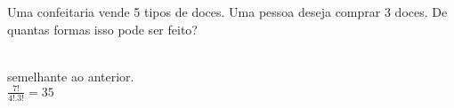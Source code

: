 \begin{ex}
 Uma confeitaria vende 5 tipos de doces. Uma pessoa deseja comprar 3 doces. De quantas formas isso pode ser feito?
   \begin{sol}
       \phantom{A} \\
    semelhante ao anterior. \\ $\frac{7!}{4!.3!}= 35$ 
   \end{sol}
\end{ex}